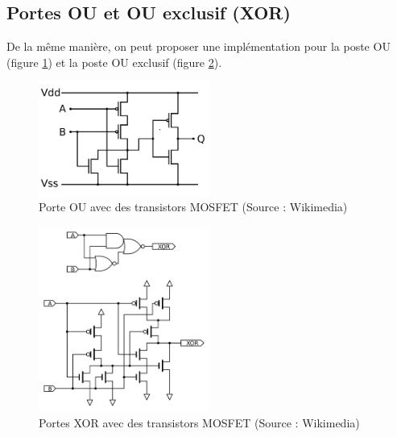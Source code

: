 \documentclass[a4paper,11pt]{book}
\theoremstyle{definition}
\begin{document}
\subsection{Portes OU et OU exclusif (XOR)}
De la même manière, on peut proposer une implémentation pour la poste OU (figure \ref{fig:OU_MOS}) et la poste OU exclusif (figure \ref{fig:XOR_MOS}).

\begin{figure}
\centering
\includegraphics[width=0.5\textwidth]{media/ImplementationGates/1920px-CMOS_OR.svg.png}
\caption{Porte OU avec des transistors MOSFET (Source : Wikimedia)}
\label{fig:OU_MOS}
\end{figure}

\begin{figure}
\centering
\includegraphics[width=0.5\textwidth]{media/ImplementationGates/1280px-CMOS10TrXOR.svg.png}
\caption{Portes XOR avec des transistors MOSFET (Source : Wikimedia)}
\label{fig:XOR_MOS}
\end{figure}
\end{document}
